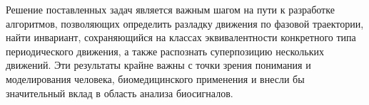\documentclass[12pt, twoside]{article}
\theoremstyle{definition}
\begin{document}
Решение поставленных задач является важным шагом на пути к разработке алгоритмов, позволяющих определить разладку движения по фазовой траектории, найти инвариант, сохраняющийся на классах эквивалентности конкретного типа периодического движения, а также распознать суперпозицию нескольких движений. Эти результаты крайне важны с точки зрения понимания и моделирования человека, биомедицинского применения и внесли бы значительный вклад в область анализа биосигналов.





    
    
\end{document}

